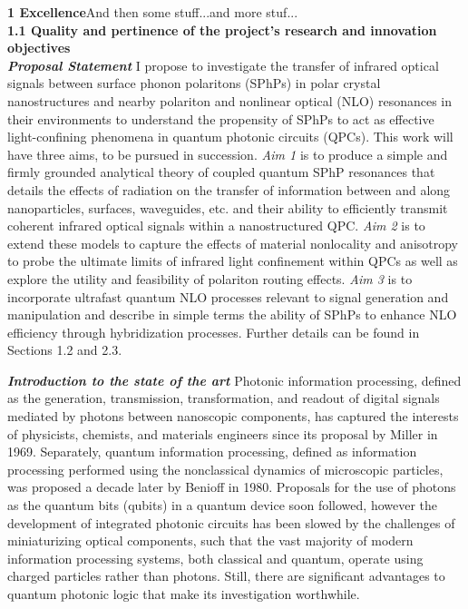 \documentclass[11pt,a4paper]{article}
\begin{document}
\noindent\textbf{1 Excellence}And then some stuff...and more stuf...\\
\noindent\textbf{1.1 Quality and pertinence of the project's research and innovation objectives}\\
\indent \textbf{\textit{Proposal Statement}} I propose to investigate the transfer of infrared optical signals between surface phonon polaritons (SPhPs) in polar crystal nanostructures and nearby polariton and nonlinear optical (NLO) resonances in their environments to understand the propensity of SPhPs to act as effective light-confining phenomena in quantum photonic circuits (QPCs). This work will have three aims, to be pursued in succession. \textit{Aim 1} is to produce a simple and firmly grounded analytical theory of coupled quantum SPhP resonances that details the effects of radiation on the transfer of information between and along nanoparticles, surfaces, waveguides, etc. and their ability to efficiently transmit coherent infrared optical signals within a nanostructured QPC. \textit{Aim 2} is to extend these models to capture the effects of material nonlocality and anisotropy to probe the ultimate limits of infrared light confinement within QPCs as well as explore the utility and feasibility of polariton routing effects. \textit{Aim 3} is to incorporate ultrafast quantum NLO processes relevant to signal generation and manipulation and describe in simple terms the ability of SPhPs to enhance NLO efficiency through hybridization processes. Further details can be found in Sections 1.2 and 2.3.









\textbf{\textit{Introduction to the state of the art}} Photonic information processing, defined as the generation, transmission, transformation, and readout of digital signals mediated by photons between nanoscopic components, has captured the interests of physicists, chemists, and materials engineers since its proposal by Miller in 1969.\supercite{miller1969integrated} Separately, quantum information processing, defined as information processing performed using the nonclassical dynamics of microscopic particles, was proposed a decade later by Benioff in 1980.\supercite{benioff_computer_1980} Proposals for the use of photons as the quantum bits (qubits) in a quantum device soon followed,\supercite{milburn_quantum_1989,knill_scheme_2001} however the development of integrated photonic circuits has been slowed by the challenges of miniaturizing optical components, such that the vast majority of modern information processing systems, both classical and quantum, operate using charged particles rather than photons. Still, there are significant advantages to quantum photonic logic that make its investigation worthwhile.
\end{document}
